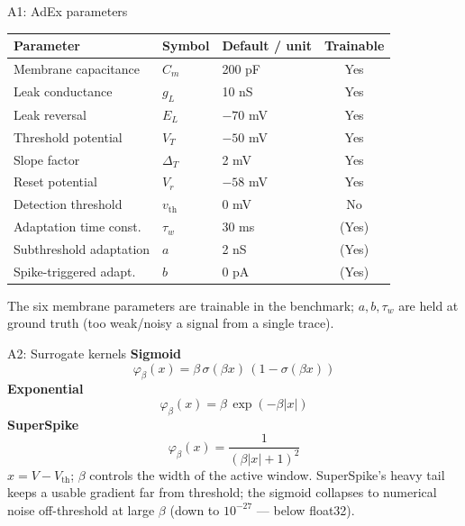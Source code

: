 \documentclass[17pt, t, lualatex]{beamer}
\begin{document}
\begin{frame}{A1: AdEx parameters}
\centering\small
\begin{tabular}{lllc}
\toprule
\textbf{Parameter} & \textbf{Symbol} & \textbf{Default / unit} & \textbf{Trainable} \\
\midrule
Membrane capacitance     & $C_m$        & 200 pF   & Yes \\
Leak conductance         & $g_L$        & 10 nS    & Yes \\
Leak reversal            & $E_L$        & $-70$ mV & Yes \\
Threshold potential      & $V_T$        & $-50$ mV & Yes \\
Slope factor             & $\Delta_T$   & 2 mV     & Yes \\
Reset potential          & $V_r$        & $-58$ mV & Yes \\
Detection threshold      & $v_{\text{th}}$ & 0 mV  & No \\
Adaptation time const.   & $\tau_w$     & 30 ms    & (Yes) \\
Subthreshold adaptation  & $a$          & 2 nS     & (Yes) \\
Spike-triggered adapt.   & $b$          & 0 pA     & (Yes) \\
\bottomrule
\end{tabular}
\vspace{0.3cm}

\footnotesize The six membrane parameters are trainable in the benchmark; $a,b,\tau_w$ are held at ground truth (too weak/noisy a signal from a single trace).
\end{frame}

\begin{frame}{A2: Surrogate kernels}
\textbf{Sigmoid}
\[ \varphi_\beta(x) = \beta\,\sigma(\beta x)\,(1-\sigma(\beta x)) \]
\textbf{Exponential}
\[ \varphi_\beta(x) = \beta\,\exp(-\beta|x|) \]
\textbf{SuperSpike}
\[ \varphi_\beta(x) = \frac{1}{(\beta|x|+1)^2} \]
\vspace{0.2cm}
\small $x = V - V_{\text{th}}$; $\beta$ controls the width of the active window. SuperSpike's heavy tail keeps a usable gradient far from threshold; the sigmoid collapses to numerical noise off-threshold at large $\beta$ (down to $10^{-27}$ --- below float32).
\end{frame}
\end{document}
